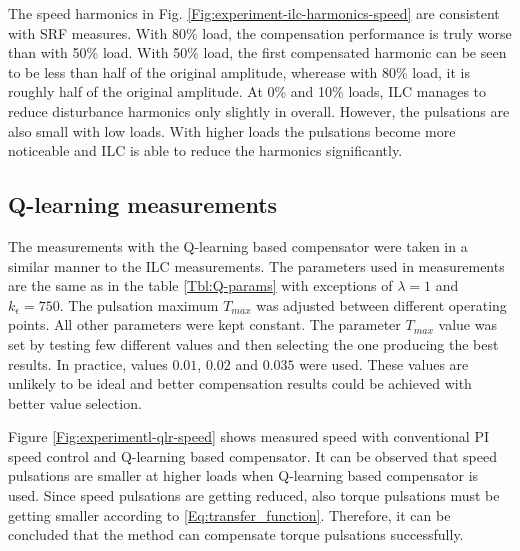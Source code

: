 The speed harmonics in Fig. \ref{Fig:experiment-ilc-harmonics-speed} are consistent with SRF measures. With 80\% load, the compensation performance is truly worse than with 50\% load. With 50\% load, the first compensated harmonic can be seen to be less than half of the original amplitude, wherease with 80\% load, it is roughly half of the original amplitude. At 0\% and 10\% loads, ILC manages to reduce disturbance harmonics only slightly in overall. However, the pulsations are also small with low loads. With higher loads the pulsations become more noticeable and ILC is able to reduce the harmonics significantly.






\subsection{Q-learning measurements}

The measurements with the Q-learning based compensator were taken in a similar manner to the ILC measurements. The parameters used in measurements are the same as in the table \ref{Tbl:Q-params} with exceptions of $\lambda = 1$ and $k_\epsilon = 750$. The pulsation maximum $T_{max}$ was adjusted between different operating points. All other parameters were kept constant. The parameter $T_{max}$ value was set by testing few different values and then selecting the one producing the best results. In practice, values $0.01$, $0.02$ and $0.035$ were used. These values are unlikely to be ideal and better compensation results could be achieved with better value selection.

Figure \ref{Fig:experimentl-qlr-speed} shows measured speed with conventional PI speed control and Q-learning based compensator. It can be observed that speed pulsations are smaller at higher loads when Q-learning based compensator is used. Since speed pulsations are getting reduced, also torque pulsations must be getting smaller according to \eqref{Eq:transfer_function}. Therefore, it can be concluded that the method can compensate torque pulsations successfully.


